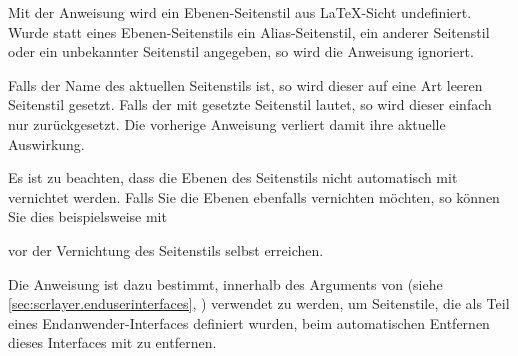 \begin{Declaration}
\end{Declaration}
%
%
\iftrue%
Mit der Anweisung wird ein Ebenen-Seitenstil aus \LaTeX-Sicht undefiniert.
Wurde statt eines Ebenen-Seitenstils ein Alias-Seitenstil, ein anderer
Seitenstil oder ein unbekannter Seitenstil angegeben, so wird die Anweisung
ignoriert.%
\else%
Mit dieser Anweisung kann ein Ebenen-Seitenstil aus \LaTeX-Sicht wieder
undefiniert werden. Dies gilt jedoch nur, wenn es einen Ebenen-Seitenstil mit
dem Namen \PName{Ebenen-Seitenstil-Name} auch tatsächlich gibt. Handelt es sich
stattdessen um einen Alias-Seitenstil -- auch wenn dieser zu einem
Ebenen-Seitenstil führt -- oder um einen anderen Seitenstil oder ist gar kein
Seitenstil mit dem Namen \PName{Ebenen-Seitenstil-Name} bekannt, so geschieht
nichts, die Anweisung wird ignoriert.%
\fi

Falls  der Name des aktuellen Seitenstils ist,
so wird dieser auf eine Art leeren Seitenstil gesetzt. Falls der mit
 gesetzte Seitenstil
 lautet, so wird dieser einfach nur
zurückgesetzt. Die vorherige Anweisung 
verliert damit ihre aktuelle Auswirkung.

Es ist zu beachten, dass die Ebenen des Seitenstils nicht
automatisch mit vernichtet werden. Falls Sie die Ebenen ebenfalls vernichten
möchten, so können Sie dies beispielsweise mit
\begin{lstcode}
\end{lstcode}
vor der Vernichtung des Seitenstils selbst erreichen.

Die Anweisung ist dazu bestimmt, innerhalb des Arguments  von
 (siehe
\autoref{sec:scrlayer.enduserinterfaces},
) verwendet zu
werden, um Seitenstile, die als Teil eines Endanwender-Interfaces definiert
wurden, beim automatischen Entfernen dieses Interfaces mit zu entfernen.%
\EndIndexGroup
\EndIndexGroup


